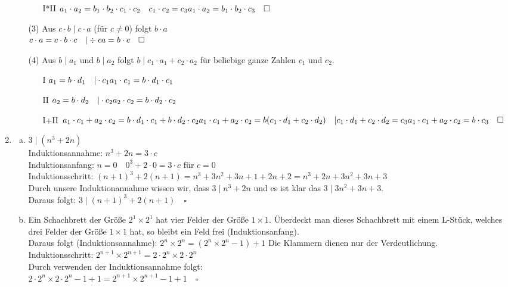 \documentclass[a4paper]{scrartcl}
\newcommand{\qed}{\quad \square}
\begin{document}
\begin{enumerate}[1.]
\begin{enumerate}
\begin{enumerate}
\item[I*II] $ a_1 \cdot a_2 = b_1 \cdot b_2 \cdot c_1 \cdot c_2 \quad c_1 \cdot c_2 = c_3\\
a_1 \cdot a_2 = b_1 \cdot b_2 \cdot c_3 \qed$
\end{enumerate}
\item[(3)]
Aus $ c \cdot b \mid c \cdot a$ (für $c \ne	0$) folgt $b \cdot a$\\
$c \cdot a = c \cdot b \cdot c \quad | \div c\\
a = b \cdot c \qed$
\item[(4)]
Aus $b \mid a_1$ und $b \mid a_2$ folgt $b \mid c_1 \cdot a_1 + c_2 \cdot a_2$ für beliebige ganze Zahlen $c_1$ und $c_2$.\\
\begin{enumerate}
\item[I] $a_1 = b \cdot d_1 \quad | \cdot c_1\\
a_1 \cdot c_1 = b \cdot d_1 \cdot c_1$
\item[II] $a_2 = b \cdot d_2 \quad | \cdot c_2\\
a_2 \cdot c_2 = b \cdot d_2 \cdot c_2$
\item[I+II] $a_1 \cdot c_1 + a_2 \cdot c_2 = b \cdot d_1 \cdot c_1 + b \cdot d_2 \cdot c_2\\
a_1 \cdot c_1 + a_2 \cdot c_2 = b(c_1 \cdot d_1 + c_2 \cdot d_2) \quad | c_1 \cdot d_1 + c_2 \cdot d_2 = c_3\\
a_1 \cdot c_1 + a_2 \cdot c_2 = b \cdot c_3 \qed$ 
\end{enumerate}
\end{enumerate}
\item
\begin{enumerate}[a)]
\item
$3 \mid (n^3+2n)$\\
Induktionsannahme: $n^3+2n = 3 \cdot c$\\
Induktionsanfang: $n=0\quad 0^3+2\cdot 0=3\cdot c$ für $c=0$\\
Induktionsschritt: $(n+1)^3+2(n+1)=n^3+3n^2+3n+1+2n+2=n^3+2n+3n^2+3n+3$\\
Durch unsere Induktionannahme wissen wir, dass $3\mid n^3+2n$ und es ist klar das $3\mid 3n^2+3n+3$.\\
Daraus folgt: $3\mid (n+1)^3+2(n+1) \qed$
\item
Ein Schachbrett der Größe $2^1 \times 2^1$ hat vier Felder der Größe $1 \times 1$. Überdeckt man dieses Schachbrett mit einem L-Stück, welches
drei Felder der Größe $1 \times 1$ hat, so bleibt ein Feld frei (Induktionsanfang).\\
Daraus folgt (Induktionsannahme): $2^n \times 2^n = (2^n \times 2^n -1) + 1$ Die Klammern dienen nur der Verdeutlichung.\\
Induktionsschritt: $2^{n+1} \times 2^{n+1} = 2\cdot 2^n \times 2 \cdot 2^n$ \\
Durch verwenden der Induktionsannahme folgt:\\
$2\cdot 2^n \times 2 \cdot 2^n -1 +1 = 2^{n+1} \times 2^{n+1} -1 +1 \qed$
\end{enumerate}
\end{enumerate} 
\end{document}
